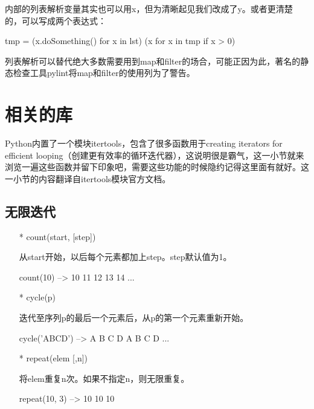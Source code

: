 \documentclass[12pt,a4paper]{report}
\begin{document}
内部的列表解析变量其实也可以用x，但为清晰起见我们改成了y。或者更清楚的，可以写成两个表达式：
\begin{python}[moreemph={[4]42},caption={},label=ex1]
tmp = (x.doSomething() for x in lst)
(x for x in tmp if x > 0)
\end{python}

列表解析可以替代绝大多数需要用到map和filter的场合，可能正因为此，著名的静态检查工具pylint将map和filter的使用列为了警告。 

\section{相关的库} 

Python内置了一个模块itertools，包含了很多函数用于creating iterators for efficient looping（创建更有效率的循环迭代器），这说明很是霸气，这一小节就来浏览一遍这些函数并留下印象吧，需要这些功能的时候隐约记得这里面有就好。这一小节的内容翻译自itertools模块官方文档。
\subsection{无限迭代} 
\begin{itemize}
    \item[*]count(start, [step])
        
        从start开始，以后每个元素都加上step。step默认值为1。
        \begin{python}[moreemph={[4]42},caption={},label=ex1]
count(10) --> 10 11 12 13 14 ...
        \end{python}
    \item[*]cycle(p)
        
        迭代至序列p的最后一个元素后，从p的第一个元素重新开始。
        \begin{python}[moreemph={[4]42},caption={},label=ex1]
cycle('ABCD') --> A B C D A B C D ...
        \end{python}
    \item[*]repeat(elem [,n]) 
        
        将elem重复n次。如果不指定n，则无限重复。
        \begin{python}[moreemph={[4]42},caption={},label=ex1]
repeat(10, 3) --> 10 10 10
        \end{python}
\end{itemize}
\end{document}

